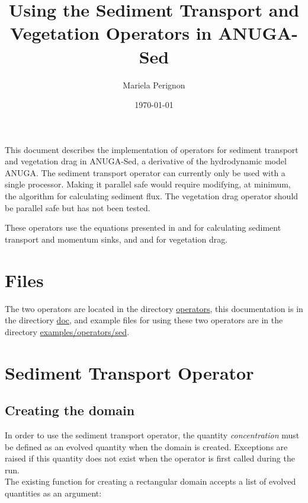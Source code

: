 \documentclass[10pt]{article}
\begin{document}
\title{Using the Sediment Transport and Vegetation Operators in ANUGA-Sed}
\author{Mariela Perignon}
\date{\today}
\maketitle

This document describes the implementation of operators for sediment transport and vegetation drag in ANUGA-Sed, a derivative of the hydrodynamic model ANUGA. The sediment transport operator can currently only be used with a single processor. Making it parallel safe would require modifying, at minimum, the algorithm for calculating sediment flux. The vegetation drag operator should be parallel safe but has not been tested.

These operators use the equations presented in \citet{Simpson:2006aa} and \citet{davy2009fluvial} for calculating sediment transport and momentum sinks, and \citet{nepf1999drag} and \citet{kean2006form} for vegetation drag.

\section{Files}

The two operators are located in the directory \url{operators}, this documentation is in the directiory \url{doc}, and example files for using these two operators are in the directory \url{examples/operators/sed}.

\section{Sediment Transport Operator}

\subsection{Creating the domain}\label{domain}

In order to use the sediment transport operator, the quantity \textit{concentration} must be defined as an evolved quantity when the domain is created. Exceptions are raised if this quantity does not exist when the operator is first called during the run.
\ \\

The existing function for creating a rectangular domain accepts a list of evolved quantities as an argument:
\end{document}
